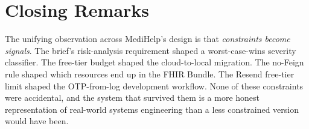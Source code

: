 \documentclass[12pt]{caltech_thesis}
\begin{document}
\section{Closing Remarks}

The unifying observation across MediHelp's design is that
\emph{constraints become signals}. The brief's risk-analysis requirement
shaped a worst-case-wins severity classifier. The free-tier budget
shaped the cloud-to-local migration. The no-Feign rule shaped which
resources end up in the FHIR Bundle. The Resend free-tier limit shaped
the OTP-from-log development workflow. None of these constraints were
accidental, and the system that survived them is a more honest
representation of real-world systems engineering than a less
constrained version would have been.




\end{document}
